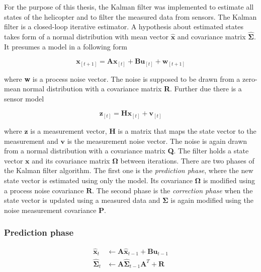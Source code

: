 For the purpose of this thesis, the Kalman filter was implemented to estimate all states of the helicopter and to filter the measured data from sensors. The Kalman filter is a closed-loop iterative estimator. A hypothesis about estimated states takes form of a normal distribution with mean vector $\hat{\textbf{x}}$ and covariance matrix $\hat{\boldsymbol{\Sigma}}$. It presumes a model in a following form

\begin{equation}
\textbf{x}_{[t+1]} = \textbf{A}\textbf{x}_{[t]} + \textbf{B}\textbf{u}_{[t]} + \textbf{w}_{[t+1]}
\end{equation}

where \textbf{w} is a process noise vector. The noise is supposed to be drawn from a zero-mean normal distribution with a covariance matrix \textbf{R}. Further due there is a sensor model

\begin{equation}
\textbf{z}_{[t]} = \textbf{H}\textbf{x}_{[t]} + \textbf{v}_{[t]}
\end{equation}

where $\textbf{z}$ is a measurement vector, \textbf{H} is a matrix that maps the state vector to the measurement and $\textbf{v}$ is the measurement noise vector. The noise is again drawn from a normal distribution with a covariance matrix \textbf{Q}. The filter holds a state vector $\textbf{\^x}$ and its covariance matrix $\boldsymbol{\Omega}$ between iterations. There are two phases of the Kalman filter algorithm. The first one is the \textit{prediction phase}, where the new state vector is estimated using only the model. Its covariance $\boldsymbol{\Omega}$ is modified using a process noise covariance $\textbf{R}$. The second phase is the \textit{correction phase} when the state vector is updated using a measured data and $\boldsymbol{\Sigma}$ is again modified using the noise measurement covariance \textbf{P}.      

\subsubsection*{Prediction phase}

\begin{equation}
\begin{split}
\hat{\textbf{x}}_t &\leftarrow \textbf{A}\hat{\textbf{x}}_{t-1} + \textbf{B}\textbf{u}_{t-1} \\
\hat{\boldsymbol{\Sigma}}_t &\leftarrow \textbf{A}\hat{\boldsymbol{\Sigma}}_{t-1}\textbf{A}^{T} + \textbf{R}
\end{split}
\end{equation}

